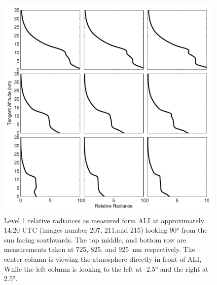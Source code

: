 \documentclass[12pt]{article}
\begin{document}
\begin{figure}
\includegraphics[width=1.0\textwidth]{./Images/AliRadiances.pdf}
    \caption{Level 1 relative radiances as measured form ALI at approximately 14:20 UTC (images number 207, 211,and 215) looking 90\si{\degree} from the sun facing southwards. The top middle, and bottom row are measurements taken at 725, 825, and 925~nm respectively. The center column is viewing the atmosphere directly in front of ALI, While the left column is looking to the left at -2.5\si{\degree} and the right at 2.5\si{\degree}. }
    \label{fig:AliRadiances}
\end{figure}

\newpage
\end{document}
